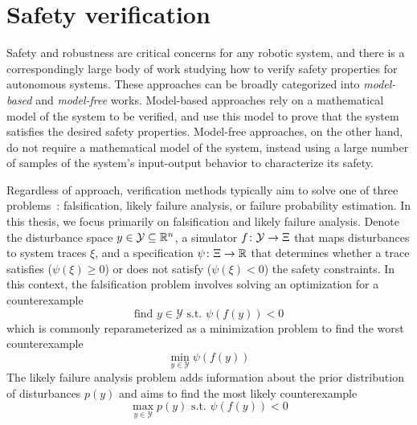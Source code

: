 \section{Safety verification}

Safety and robustness are critical concerns for any robotic system, and there is a correspondingly large body of work studying how to verify safety properties for autonomous systems. These approaches can be broadly categorized into \textit{model-based} and \textit{model-free} works. Model-based approaches rely on a mathematical model of the system to be verified, and use this model to prove that the system satisfies the desired safety properties. Model-free approaches, on the other hand, do not require a mathematical model of the system, instead using a large number of samples of the system's input-output behavior to characterize its safety.

Regardless of approach, verification methods typically aim to solve one of three problems~\cite{corsoSurveyAlgorithmsBlackBox2021}: falsification, likely failure analysis, or failure probability estimation. In this thesis, we focus primarily on falsification and likely failure analysis. Denote the disturbance space $y \in \mathcal{Y} \subseteq \mathbb{R}^n$, a simulator $f \colon \mathcal{Y} \to \Xi$ that maps disturbances to system traces $\xi$, and a specification $\psi \colon \Xi \to \mathbb{R}$ that determines whether a trace satisfies ($\psi(\xi) \geq 0$) or does not satisfy ($\psi(\xi) < 0$) the safety constraints. In this context, the falsification problem involves solving an optimization for a counterexample
%
\begin{equation}
	\text{find } {y \in \mathcal{Y}} \text{ s.t. } \psi(f(y)) < 0
\end{equation}
%
which is commonly reparameterized as a minimization problem to find the worst counterexample
%
\begin{equation}
	\min_{y \in \mathcal{Y}} \psi(f(y))\label{ch4:eq:falsification_opt}
\end{equation}
%
The likely failure analysis problem adds information about the prior distribution of disturbances $p(y)$ and aims to find the most likely counterexample
%
\begin{equation}
	\max_{y \in \mathcal{Y}} p(y) \text{ s.t. } \psi(f(y)) < 0 \label{ch4:eq:likely_failure_opt}
\end{equation}
%

